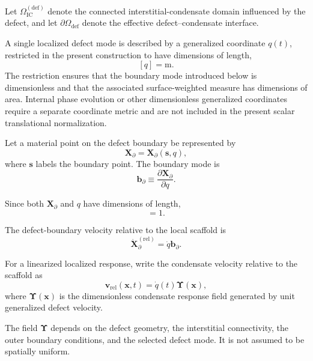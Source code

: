 Let $\Omega_{\mathrm{IC}}^{(\mathrm{def})}$ denote the connected interstitial-condensate domain influenced by the defect, and let $\partial\Omega_{\mathrm{def}}$ denote the effective defect--condensate interface.

A single localized defect mode is described by a generalized coordinate $q(t)$, restricted in the present construction to have dimensions of length,
\begin{equation}
    \boxed{ [q]=\mathrm{m} }.
\end{equation}
The restriction ensures that the boundary mode introduced below is dimensionless and that the associated surface-weighted measure has dimensions of area. Internal phase evolution or other dimensionless generalized coordinates require a separate coordinate metric and are not included in the present scalar translational normalization.

Let a material point on the defect boundary be represented by
\begin{equation}
    \mathbf{X}_{\partial} = \mathbf{X}_{\partial}(\boldsymbol{s},q),
\end{equation}
where $\boldsymbol{s}$ labels the boundary point. The boundary mode is
\begin{equation}
    \mathbf{b}_{\partial} \equiv \frac{\partial\mathbf{X}_{\partial}}{\partial q}.
\end{equation}

Since both $\mathbf{X}_{\partial}$ and $q$ have dimensions of length,
\begin{equation}
    [\mathbf{b}_{\partial}]=1.
\end{equation}

The defect-boundary velocity relative to the local scaffold is
\begin{equation}
    \dot{\mathbf{X}}_{\partial}^{(\mathrm{rel})} = \dot{q}\mathbf{b}_{\partial}.
\end{equation}

For a linearized localized response, write the condensate velocity relative to the scaffold as
\begin{equation}
    \mathbf{v}_{\mathrm{rel}}(\mathbf{x},t) = \dot{q}(t) \boldsymbol{\Upsilon}(\mathbf{x}),
\end{equation}
where $\boldsymbol{\Upsilon}(\mathbf{x})$ is the dimensionless condensate response field generated by unit generalized defect velocity.

The field $\boldsymbol{\Upsilon}$ depends on the defect geometry, the interstitial connectivity, the outer boundary conditions, and the selected defect mode. It is not assumed to be spatially uniform.

